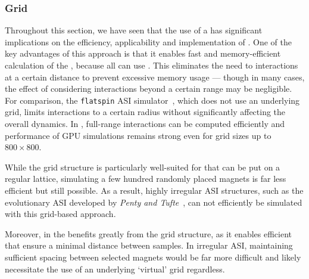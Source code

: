 \subsubsection{Grid}
Throughout this section, we have seen that the use of a  has significant implications on the efficiency, applicability and implementation of \hotspice.
One of the key advantages of this approach is that it enables fast and memory-efficient calculation of the , because all  can use .
This eliminates the need to  interactions at a certain distance to prevent excessive memory usage --- though in many cases, the effect of considering interactions beyond a certain range may be negligible.
For comparison, the \texttt{flatspin} ASI simulator~\cite{flatspin}, which does not use an underlying grid, limits interactions to a certain radius without significantly affecting the overall dynamics.
In \hotspice, full-range interactions can be computed efficiently and performance of GPU simulations remains strong even for grid sizes up to $800 \times 800$. \par
While the grid structure is particularly well-suited for  that can be put on a regular lattice, simulating a few hundred randomly placed magnets is far less efficient but still possible.
As a result, highly irregular ASI structures, such as the evolutionary ASI developed by \textit{Penty and Tufte}~\cite{ASI_Evolutionary_ALife}, can not efficiently be simulated with this grid-based approach. \par
Moreover,  in the  benefits greatly from the grid structure, as it enables efficient  that ensure a minimal distance between samples.
In irregular ASI, maintaining sufficient spacing between selected magnets would be far more difficult and likely necessitate the use of an underlying `virtual' grid regardless.

